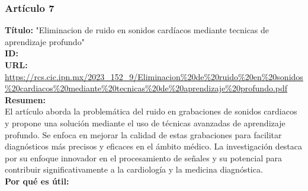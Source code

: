 \subsubsection*{Artículo 7}
 \begin{flushleft}
     \textbf{Título:}
     "Eliminacion de ruido en sonidos cardíacos mediante tecnicas de aprendizaje profundo"
     \\
     \textbf{ID: \cite{rodriguezeliminacion}}
     \\
     \textbf{URL:}
     \url{https://rcs.cic.ipn.mx/2023_152_9/Eliminacion%20de%20ruido%20en%20sonidos%20cardiacos%20mediante%20tecnicas%20de%20aprendizaje%20profundo.pdf}
     \\
     \textbf{Resumen:\\}
     El artículo aborda la problemática del ruido en grabaciones de sonidos cardiacos y propone una solución mediante el uso de técnicas avanzadas de aprendizaje profundo. Se enfoca en mejorar la calidad de estas grabaciones para facilitar diagnósticos más precisos y eficaces en el ámbito médico. La investigación destaca por su enfoque innovador en el procesamiento de señales y su potencial para contribuir significativamente a la cardiología y la medicina diagnóstica.
     \\
     \textbf{Por qué es útil:\\}
 \end{flushleft}
